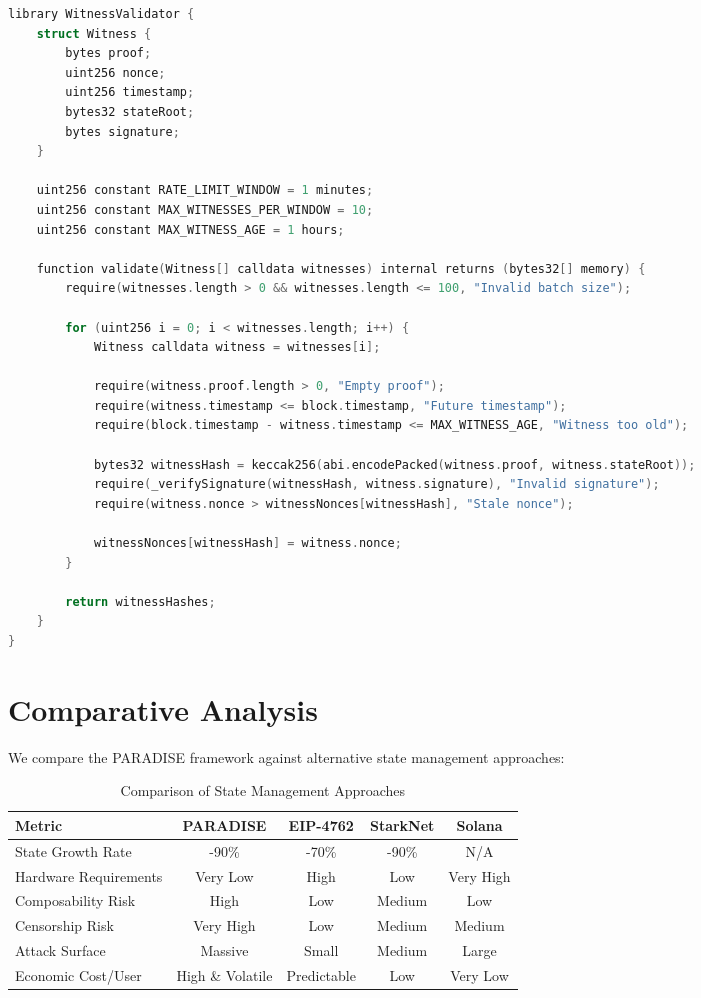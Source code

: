 \documentclass{article}
\begin{document}
\begin{lstlisting}[language=C,caption={Enhanced Witness Validation},label={lst:witness-validation}]
library WitnessValidator {
    struct Witness {
        bytes proof;
        uint256 nonce;
        uint256 timestamp;
        bytes32 stateRoot;
        bytes signature;
    }
    
    uint256 constant RATE_LIMIT_WINDOW = 1 minutes;
    uint256 constant MAX_WITNESSES_PER_WINDOW = 10;
    uint256 constant MAX_WITNESS_AGE = 1 hours;
    
    function validate(Witness[] calldata witnesses) internal returns (bytes32[] memory) {
        require(witnesses.length > 0 && witnesses.length <= 100, "Invalid batch size");
        
        for (uint256 i = 0; i < witnesses.length; i++) {
            Witness calldata witness = witnesses[i];
            
            require(witness.proof.length > 0, "Empty proof");
            require(witness.timestamp <= block.timestamp, "Future timestamp");
            require(block.timestamp - witness.timestamp <= MAX_WITNESS_AGE, "Witness too old");
            
            bytes32 witnessHash = keccak256(abi.encodePacked(witness.proof, witness.stateRoot));
            require(_verifySignature(witnessHash, witness.signature), "Invalid signature");
            require(witness.nonce > witnessNonces[witnessHash], "Stale nonce");
            
            witnessNonces[witnessHash] = witness.nonce;
        }
        
        return witnessHashes;
    }
}
\end{lstlisting}

\section{Comparative Analysis}

We compare the PARADISE framework against alternative state management approaches:

\begin{table}[h]
\centering
\begin{tabular}{|l|c|c|c|c|}
\hline
\textbf{Metric} & \textbf{PARADISE} & \textbf{EIP-4762} & \textbf{StarkNet} & \textbf{Solana} \\
\hline
State Growth Rate & -90\% & -70\% & -90\% & N/A \\
Hardware Requirements & Very Low & High & Low & Very High \\
Composability Risk & High & Low & Medium & Low \\
Censorship Risk & Very High & Low & Medium & Medium \\
Attack Surface & Massive & Small & Medium & Large \\
Economic Cost/User & High \& Volatile & Predictable & Low & Very Low \\
\hline
\end{tabular}
\caption{Comparison of State Management Approaches}
\label{tab:comparison}
\end{table}
\end{document}
